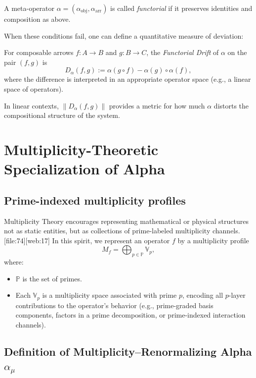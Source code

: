 \documentclass[11pt]{article}
\begin{document}
\begin{definition}
A meta-operator \(\alpha = (\alpha_{\mathrm{obj}},\alpha_{\mathrm{arr}})\) is called \emph{functorial} if it preserves identities and composition as above.
\end{definition}

When these conditions fail, one can define a quantitative measure of deviation:

\begin{definition}
For composable arrows \(f : A \to B\) and \(g : B \to C\), the \emph{Functorial Drift} of \(\alpha\) on the pair \((f,g)\) is
\[
D_\alpha(f,g) := \alpha(g \circ f) - \alpha(g) \circ \alpha(f),
\]
where the difference is interpreted in an appropriate operator space (e.g., a linear space of operators).
\end{definition}

In linear contexts, \(\|D_\alpha(f,g)\|\) provides a metric for how much \(\alpha\) distorts the compositional structure of the system.

\section{Multiplicity-Theoretic Specialization of Alpha}

\subsection{Prime-indexed multiplicity profiles}

Multiplicity Theory encourages representing mathematical or physical structures not as static entities, but as collections of prime-labeled multiplicity channels.\,[file:74][web:17] In this spirit, we represent an operator \(f\) by a multiplicity profile
\[
M_f = \bigoplus_{p \in \mathbb{P}} \mathbb{V}_p,
\]
where:
\begin{itemize}
  \item \(\mathbb{P}\) is the set of primes.
  \item Each \(\mathbb{V}_p\) is a multiplicity space associated with prime \(p\), encoding all \(p\)-layer contributions to the operator's behavior (e.g., prime-graded basis components, factors in a prime decomposition, or prime-indexed interaction channels).
\end{itemize}

\subsection{Definition of Multiplicity--Renormalizing Alpha \texorpdfstring{\(\alpha_\mu\)}{alpha\_mu}}
\end{document}
